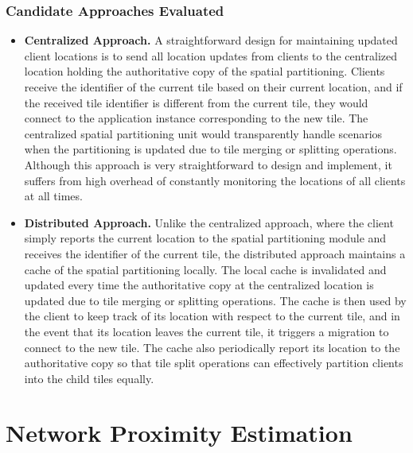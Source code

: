 \subsubsection{Candidate Approaches Evaluated}
\begin{itemize}
\item \textbf{Centralized Approach. }A straightforward design for maintaining updated client locations is to send all location updates from clients to the centralized location holding the authoritative copy of the spatial partitioning. Clients receive the identifier of the current tile based on their current location, and if the received tile identifier is different from the current tile, they would connect to the application instance corresponding to the new tile. The centralized spatial partitioning unit would transparently handle scenarios when the partitioning is updated due to tile merging or splitting operations. Although this approach is very straightforward to design and implement, it suffers from high overhead of constantly monitoring the locations of all clients at all times.
\item \textbf{Distributed Approach. } Unlike the centralized approach, where the client simply reports the current location to the spatial partitioning module and receives the identifier of the current tile, the distributed approach maintains a cache of the spatial partitioning locally. The local cache is invalidated and updated every time the authoritative copy at the centralized location is updated due to tile merging or splitting operations. The cache is then used by the client to keep track of its location with respect to the current tile, and in the event that its location leaves the current tile, it triggers a migration to connect to the new tile. The cache also periodically report its location to the authoritative copy so that tile split operations can effectively partition clients into the child tiles equally.
\end{itemize}

\section{Network Proximity Estimation}

